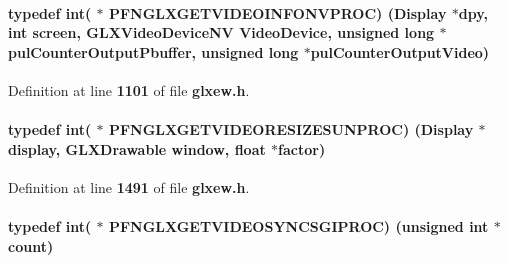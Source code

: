 \paragraph[{P\+F\+N\+G\+L\+X\+G\+E\+T\+V\+I\+D\+E\+O\+I\+N\+F\+O\+N\+V\+P\+R\+OC}]{\setlength{\rightskip}{0pt plus 5cm}typedef {\bf int}( $\ast$  P\+F\+N\+G\+L\+X\+G\+E\+T\+V\+I\+D\+E\+O\+I\+N\+F\+O\+N\+V\+P\+R\+OC) (Display $\ast$dpy, {\bf int} screen, {\bf G\+L\+X\+Video\+Device\+NV} Video\+Device, unsigned long $\ast${\bf pul\+Counter\+Output\+Pbuffer}, unsigned long $\ast${\bf pul\+Counter\+Output\+Video})}\label{glxew_8h_a7fac75306eb0b21c129eedafd422614a}


Definition at line {\bf 1101} of file {\bf glxew.\+h}.

\paragraph[{P\+F\+N\+G\+L\+X\+G\+E\+T\+V\+I\+D\+E\+O\+R\+E\+S\+I\+Z\+E\+S\+U\+N\+P\+R\+OC}]{\setlength{\rightskip}{0pt plus 5cm}typedef {\bf int}( $\ast$  P\+F\+N\+G\+L\+X\+G\+E\+T\+V\+I\+D\+E\+O\+R\+E\+S\+I\+Z\+E\+S\+U\+N\+P\+R\+OC) (Display $\ast${\bf display}, {\bf G\+L\+X\+Drawable} window, float $\ast$factor)}\label{glxew_8h_a3a4ba91620e1c15b687ca8faa3302340}


Definition at line {\bf 1491} of file {\bf glxew.\+h}.

\paragraph[{P\+F\+N\+G\+L\+X\+G\+E\+T\+V\+I\+D\+E\+O\+S\+Y\+N\+C\+S\+G\+I\+P\+R\+OC}]{\setlength{\rightskip}{0pt plus 5cm}typedef {\bf int}( $\ast$  P\+F\+N\+G\+L\+X\+G\+E\+T\+V\+I\+D\+E\+O\+S\+Y\+N\+C\+S\+G\+I\+P\+R\+OC) (unsigned {\bf int} $\ast${\bf count})}\label{glxew_8h_a89606120cd98bcbf4018569354f28fe7}


